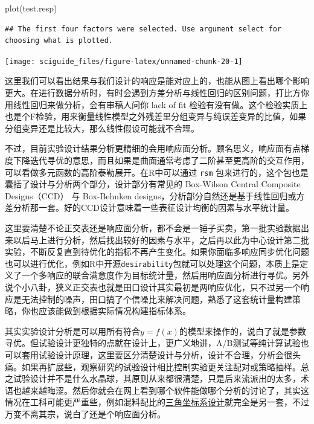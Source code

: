 \documentclass[]{tufte-book}
\newenvironment{Shaded}{}{}
\newcommand{\FunctionTok}[1]{\textcolor[rgb]{0.02,0.16,0.49}{#1}}
\newcommand{\NormalTok}[1]{#1}
\begin{document}
\begin{Shaded}
\begin{Highlighting}[]
\FunctionTok{plot}\NormalTok{(test.resp)}
\end{Highlighting}
\end{Shaded}

\begin{verbatim}
## The first four factors were selected. Use argument select for choosing what is plotted.
\end{verbatim}

\texttt{[image: sciguide\_files/figure-latex/unnamed-chunk-20-1]}

这里我们可以看出结果与我们设计的响应是能对应上的，也能从图上看出哪个影响更大。在进行数据分析时，有时会遇到方差分析与线性回归的区别问题，打比方你用线性回归来做分析，会有审稿人问你 lack of fit 检验有没有做。这个检验实质上也是个F检验，用来衡量线性模型之外残差里分组变异与纯误差变异的比值，如果分组变异还是比较大，那么线性假设可能就不合理。

不过，目前实验设计结果分析更精细的会用响应面分析。顾名思义，响应面有点梯度下降迭代寻优的意思，而且如果是曲面通常考虑了二阶甚至更高阶的交互作用，可以看做多元函数的高阶泰勒展开。在R中可以通过 \texttt{rsm} 包来进行的，这个包也是囊括了设计与分析两个部分，设计部分有常见的 Box-Wilson Central Composite Designs（CCD） 与 Box-Behnken designs，分析部分自然还是基于线性回归或方差分析那一套。好的CCD设计意味着一些表征设计均衡的因素与水平统计量。

这里要清楚不论正交表还是响应面分析，都不会是一锤子买卖，第一批实验数据出来以后马上进行分析，然后找出较好的因素与水平，之后再以此为中心设计第二批实验，不断反复直到待优化的指标不再产生变化。如果你面临多响应同步优化问题也可以进行优化，例如R中开源\texttt{desirability}包就可以处理这个问题，本质上是定义了一个多响应的联合满意度作为目标统计量，然后用响应面分析进行寻优。另外说个小八卦，狭义正交表也就是田口设计其实最初是两响应优化，只不过另一个响应是无法控制的噪声，田口搞了个信噪比来解决问题，熟悉了这套统计量构建策略，你也应该能做到根据实际情况构建指标体系。

其实实验设计分析是可以用所有符合\(y = f(x)\)的模型来操作的，说白了就是参数寻优。但试验设计更独特的点就在设计上，更广义地讲，A/B测试等纯计算试验也可以套用试验设计原理，这里要区分清楚设计与分析，设计不合理，分析会很头痛。如果再扩展些，观察研究的试验设计相比控制实验更关注配对或策略抽样。总之试验设计并不是什么水晶球，其原则从来都很清楚，只是后来流派出的太多，术语也越来越晦涩。然后你就会在网上看到哪个软件能做哪个分析的讨论了，其实这情况在工科可能更严重些，例如混料配比的\href{https://support.minitab.com/zh-cn/minitab/18/help-and-how-to/modeling-statistics/doe/supporting-topics/mixture-designs/what-is-a-mixture-design/}{三角坐标系设计}就完全是另一套，不过万变不离其宗，说白了还是个响应面分析。
\end{document}
